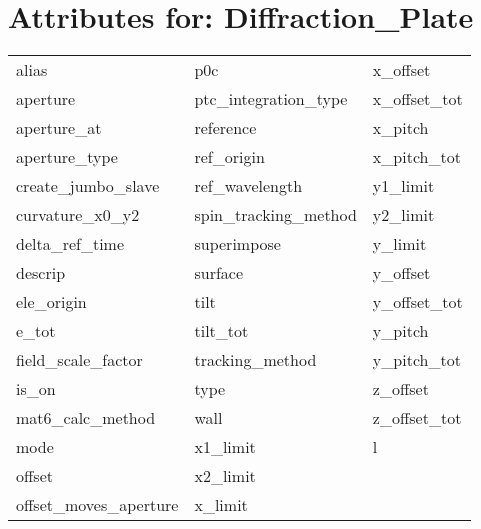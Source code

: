  \section{Attributes for: Diffraction_Plate}
 \label{s:list.diffraction.plate}
 
 \begin{tabular}{lll} \toprule
alias                       & p0c                         & x_offset                    \\
aperture                    & ptc_integration_type        & x_offset_tot                \\
aperture_at                 & reference                   & x_pitch                     \\
aperture_type               & ref_origin                  & x_pitch_tot                 \\
create_jumbo_slave          & ref_wavelength              & y1_limit                    \\
curvature_x0_y2             & spin_tracking_method        & y2_limit                    \\
delta_ref_time              & superimpose                 & y_limit                     \\
descrip                     & surface                     & y_offset                    \\
ele_origin                  & tilt                        & y_offset_tot                \\
e_tot                       & tilt_tot                    & y_pitch                     \\
field_scale_factor          & tracking_method             & y_pitch_tot                 \\
is_on                       & type                        & z_offset                    \\
mat6_calc_method            & wall                        & z_offset_tot                \\
mode                        & x1_limit                    & l                           \\
offset                      & x2_limit                    &                             \\
offset_moves_aperture       & x_limit                     &                             \\
 \bottomrule
 \end{tabular}
 \vfill
 
